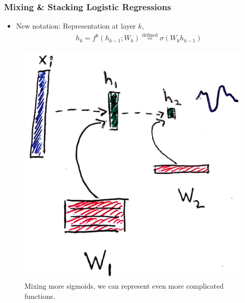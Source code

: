 \documentclass[10pt,mathserif]{beamer}
\begin{document}
\begin{frame}
  \frametitle{Mixing \& Stacking Logistic Regressions}
  \begin{itemize}
  \item New notation: Representation at layer $k$,
    \begin{align*}
      h_{k} = f^k\left(h_{k - 1}; W_k\right) \stackrel{\text{defined}}{=} \sigma\left(W_k h_{k - 1}\right)
    \end{align*}
  \end{itemize}
  \begin{figure}
    \centering
    \includegraphics[width=0.4\paperwidth]{figure/mixture_logistic_k_stacked}
    \caption{Mixing more sigmoids, we can represent even more complicated
      functions. \label{fig:mixture_logistic_k_block} }
  \end{figure}
\end{frame}
\end{document}
